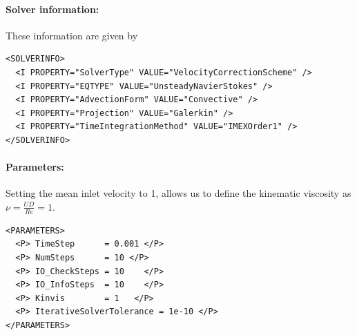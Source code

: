 \paragraph{Solver information:~} These information are given by
\begin{lstlisting}[style=XMLStyle]
<SOLVERINFO>
  <I PROPERTY="SolverType" VALUE="VelocityCorrectionScheme" />
  <I PROPERTY="EQTYPE" VALUE="UnsteadyNavierStokes" />
  <I PROPERTY="AdvectionForm" VALUE="Convective" />
  <I PROPERTY="Projection" VALUE="Galerkin" />
  <I PROPERTY="TimeIntegrationMethod" VALUE="IMEXOrder1" />
</SOLVERINFO>
\end{lstlisting}

\paragraph{Parameters:~} Setting the mean inlet velocity to 1, allows us to define the kinematic viscosity as $\nu = \frac{UD}{Re}=1$.
\begin{lstlisting}[style=XMLStyle]
<PARAMETERS>
  <P> TimeStep      = 0.001 </P>
  <P> NumSteps      = 10 </P>
  <P> IO_CheckSteps = 10    </P>
  <P> IO_InfoSteps  = 10    </P>
  <P> Kinvis        = 1   </P>
  <P> IterativeSolverTolerance = 1e-10 </P>
</PARAMETERS>
\end{lstlisting}

